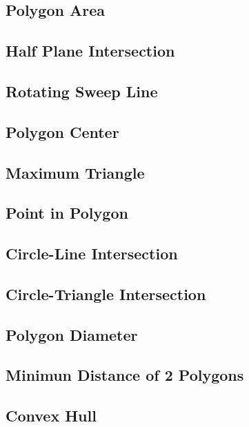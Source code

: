\documentclass[a4paper,10pt,twocolumn,oneside]{article}
\begin{document}
\subsection{Polygon Area}

\subsection{Half Plane Intersection}

\subsection{Rotating Sweep Line}

\subsection{Polygon Center}

\subsection{Maximum Triangle}

\subsection{Point in Polygon}

\subsection{Circle-Line Intersection}

\subsection{Circle-Triangle Intersection}

\subsection{Polygon Diameter}

\subsection{Minimun Distance of 2 Polygons}

\subsection{Convex Hull}

\end{document}
